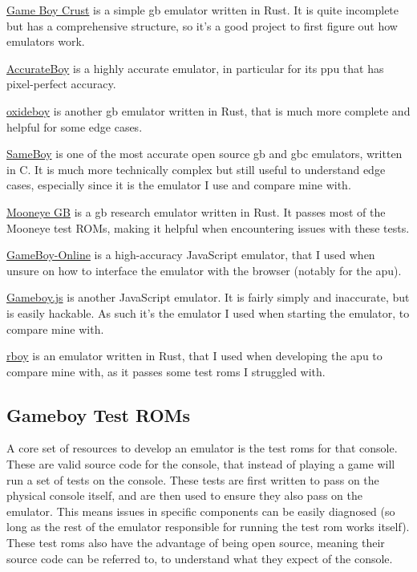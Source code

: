 \documentclass[11pt]{report}
\begin{document}
\begin{compactitem}
    \item \href{https://github.com/mattbruv/Gameboy-Crust}{Game Boy Crust} is a simple \gls{gb} emulator written in Rust. It is quite incomplete but has a comprehensive structure, so it's a good project to first figure out how emulators work.
    \item \href{https://github.com/Atem2069/accurateboy}{AccurateBoy} is a highly accurate emulator, in particular for its \gls{ppu} that has pixel-perfect accuracy.
    \item \href{https://github.com/samcday/oxideboy}{oxideboy} is another \gls{gb} emulator written in Rust, that is much more complete and helpful for some edge cases.
    \item \href{https://github.com/LIJI32/SameBoy}{SameBoy} is one of the most accurate open source \gls{gb} and \gls{gbc} emulators, written in C. It is much more technically complex but still useful to understand edge cases, especially since it is the emulator I use and compare mine with.
    \item \href{https://github.com/Gekkio/mooneye-gb}{Mooneye GB} is a \gls{gb} research emulator written in Rust. It passes most of the Mooneye test ROMs, making it helpful when encountering issues with these tests.
    \item \href{https://github.com/taisel/GameBoy-Online/}{GameBoy-Online} is a high-accuracy JavaScript emulator, that I used when unsure on how to interface the emulator with the browser (notably for the \gls{apu}).
    \item \href{https://github.com/juchi/gameboy.js/}{Gameboy.js} is another JavaScript emulator. It is fairly simply and inaccurate, but is easily hackable. As such it's the emulator I used when starting the emulator, to compare mine with.
    \item \href{https://github.com/mvdnes/rboy}{rboy} is an emulator written in Rust, that I used when developing the \gls{apu} to compare mine with, as it passes some test \glspl{rom} I struggled with.
\end{compactitem}

\subsection{Gameboy Test ROMs}
\label{sec:gb-test-roms}

A core set of resources to develop an emulator is the test \glspl{rom} for that console. These are valid source code for the console, that instead of playing a game will run a set of tests on the console. These tests are first written to pass on the physical console itself, and are then used to ensure they also pass on the emulator. This means issues in specific components can be easily diagnosed (so long as the rest of the emulator responsible for running the test \gls{rom} works itself). These test \glspl{rom} also have the advantage of being open source, meaning their source code can be referred to, to understand what they expect of the console.
\end{document}
